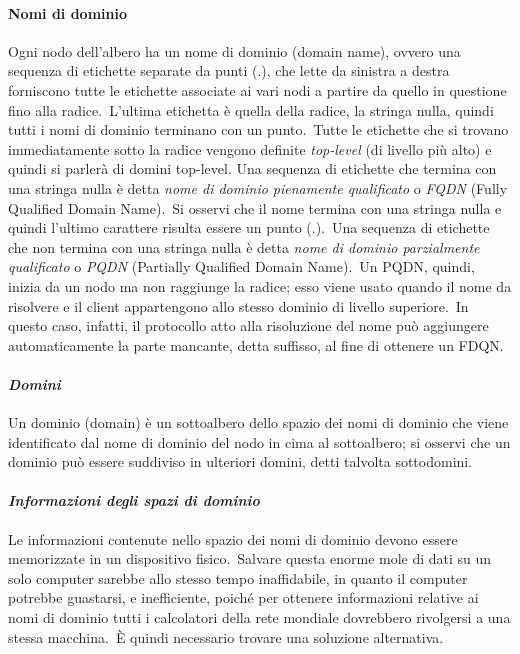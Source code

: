 \paragraph{Nomi di dominio} Ogni nodo dell'albero ha un nome di dominio (domain name), ovvero una sequenza di etichette separate da punti (.), che lette da sinistra a destra forniscono tutte le etichette associate ai vari nodi a partire da quello in questione fino alla radice.\
L'ultima etichetta è quella della radice, la stringa nulla, quindi tutti i nomi di dominio terminano con un punto.\
Tutte le etichette che si trovano immediatamente sotto la radice vengono definite \emph{top-level} (di livello più alto) e quindi si parlerà di domini top-level.
Una sequenza di etichette che termina con una stringa nulla è detta \emph{nome di dominio pienamente qualificato} o \emph{FQDN} (Fully Qualified Domain Name).\
Si osservi che il nome termina con una stringa nulla e quindi l'ultimo carattere risulta essere un punto (.).\
Una sequenza di etichette che non termina con una stringa nulla è detta \emph{nome di dominio parzialmente qualificato} o \emph{PQDN} (Partially Qualified Domain Name).\
Un PQDN, quindi, inizia da un nodo ma non raggiunge la radice; esso viene usato quando il nome da risolvere e il client appartengono allo stesso dominio di livello superiore.\
In questo caso, infatti, il protocollo atto alla risoluzione del nome può aggiungere automaticamente la parte mancante, detta suffisso, al fine di ottenere un FDQN.

\paragraph{\emph{Domini}} Un dominio (domain) è un sottoalbero dello spazio dei nomi di dominio che viene identificato dal nome di dominio del nodo in cima al sottoalbero; si osservi che un dominio può essere suddiviso in ulteriori domini, detti talvolta sottodomini.

\paragraph{\emph{Informazioni degli spazi di dominio}} Le informazioni contenute nello spazio dei nomi di dominio devono essere memorizzate in un dispositivo fisico.\
Salvare questa enorme mole di dati su un solo computer sarebbe allo stesso tempo inaffidabile, in quanto il computer potrebbe guastarsi, e inefficiente, poiché per ottenere informazioni relative ai nomi di dominio tutti i calcolatori della rete mondiale dovrebbero rivolgersi a una stessa macchina.\
È quindi necessario trovare una soluzione alternativa.

